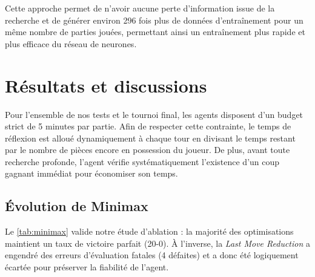 \documentclass[a4paper,11pt]{article}
\begin{document}
Cette approche permet de n'avoir aucune perte d'information issue de la recherche et de générer environ 296 fois plus de données d'entraînement pour un même nombre de parties jouées, permettant ainsi un entraînement plus rapide et plus efficace du réseau de neurones.

\section{Résultats et discussions}
\label{sec:résultats}

Pour l'ensemble de nos tests et le tournoi final, les agents disposent d'un budget strict de 5 minutes par partie. Afin de respecter cette contrainte, le temps de réflexion est alloué dynamiquement à chaque tour en divisant le temps restant par le nombre de pièces encore en possession du joueur. De plus, avant toute recherche profonde, l'agent vérifie systématiquement l'existence d'un coup gagnant immédiat pour économiser son temps.

\subsection{Évolution de Minimax}

Le \autoref{tab:minimax} valide notre étude d'ablation : la majorité des optimisations maintient un taux de victoire parfait (20-0). À l'inverse, la \textit{Last Move Reduction} a engendré des erreurs d'évaluation fatales (4 défaites) et a donc été logiquement écartée pour préserver la fiabilité de l'agent.
\end{document}
